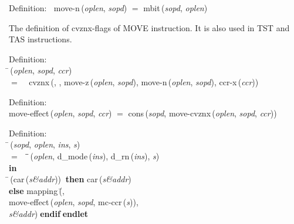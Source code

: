\begin{tabbing}{\sc Definition}:$\;\;$
{\rm{move-n}}\,({\it{oplen\/}}, {\it{sopd\/}}) $=$ {\rm{mbit}}\,({\it{sopd\/}}, {\it{oplen\/}})
\end{tabbing}

 The definition of cvznx-flags of MOVE instruction.  It is also used in
 TST and TAS instructions.
\begin{tabbing}{\sc Definition}: \\  
\=\,({\it{oplen\/}}, {\it{sopd\/}}, {\it{ccr\/}}) \\ 
$=$$\;\;\;\;${\rm{cvznx}}\,({}, {}, {\rm{move-z}}\,({\it{oplen\/}}, {\it{sopd\/}}), {\rm{move-n}}\,({\it{oplen\/}}, {\it{sopd\/}}), {\rm{ccr-x}}\,({\it{ccr\/}}))\-
\end{tabbing}

\begin{tabbing}{\sc Definition}: \\  
{\rm{move-effect}}\,({\it{oplen\/}}, {\it{sopd\/}}, {\it{ccr\/}}) $=$ {\rm{cons}}\,({\it{sopd\/}}, {\rm{move-cvznx}}\,({\it{oplen\/}}, {\it{sopd\/}}, {\it{ccr\/}}))
\end{tabbing}

\begin{tabbing}{\sc Definition}: \\  
\=\,({\it{sopd\/}}, {\it{oplen\/}}, {\it{ins\/}}, {\it{s\/}}) \\ 
$=$$\;\;\;\;$\=\=\,({\it{oplen\/}}, {\rm{d\_mode}}\,({\it{ins\/}}), {\rm{d\_rn}}\,({\it{ins\/}}), {\it{s\/}})\- \\ 
{\bf in} \\ 
\=\,({\rm{car}}\,({\it{s\&addr\/}}))$\;\;${\bf then }{\rm{car}}\,({\it{s\&addr\/}}) \\ 
{\bf else }{\rm{mapping}}\,(\=, \\ 
{\rm{move-effect}}\,({\it{oplen\/}}, {\it{sopd\/}}, {\rm{mc-ccr}}\,({\it{s\/}})), \\ 
{\it{s\&addr\/}})\-$\;${\bf  endif}\-$\;${\bf  endlet}\-\-
\end{tabbing}
      

